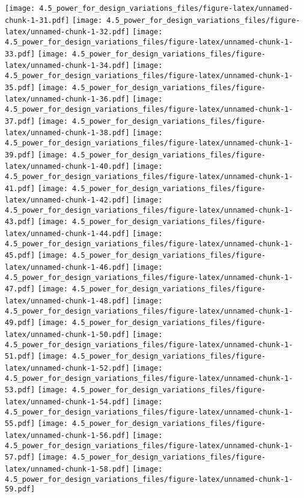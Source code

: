 \documentclass[]{article}
\begin{document}
\texttt{[image: 4.5\_power\_for\_design\_variations\_files/figure-latex/unnamed-chunk-1-31.pdf]}
\texttt{[image: 4.5\_power\_for\_design\_variations\_files/figure-latex/unnamed-chunk-1-32.pdf]}
\texttt{[image: 4.5\_power\_for\_design\_variations\_files/figure-latex/unnamed-chunk-1-33.pdf]}
\texttt{[image: 4.5\_power\_for\_design\_variations\_files/figure-latex/unnamed-chunk-1-34.pdf]}
\texttt{[image: 4.5\_power\_for\_design\_variations\_files/figure-latex/unnamed-chunk-1-35.pdf]}
\texttt{[image: 4.5\_power\_for\_design\_variations\_files/figure-latex/unnamed-chunk-1-36.pdf]}
\texttt{[image: 4.5\_power\_for\_design\_variations\_files/figure-latex/unnamed-chunk-1-37.pdf]}
\texttt{[image: 4.5\_power\_for\_design\_variations\_files/figure-latex/unnamed-chunk-1-38.pdf]}
\texttt{[image: 4.5\_power\_for\_design\_variations\_files/figure-latex/unnamed-chunk-1-39.pdf]}
\texttt{[image: 4.5\_power\_for\_design\_variations\_files/figure-latex/unnamed-chunk-1-40.pdf]}
\texttt{[image: 4.5\_power\_for\_design\_variations\_files/figure-latex/unnamed-chunk-1-41.pdf]}
\texttt{[image: 4.5\_power\_for\_design\_variations\_files/figure-latex/unnamed-chunk-1-42.pdf]}
\texttt{[image: 4.5\_power\_for\_design\_variations\_files/figure-latex/unnamed-chunk-1-43.pdf]}
\texttt{[image: 4.5\_power\_for\_design\_variations\_files/figure-latex/unnamed-chunk-1-44.pdf]}
\texttt{[image: 4.5\_power\_for\_design\_variations\_files/figure-latex/unnamed-chunk-1-45.pdf]}
\texttt{[image: 4.5\_power\_for\_design\_variations\_files/figure-latex/unnamed-chunk-1-46.pdf]}
\texttt{[image: 4.5\_power\_for\_design\_variations\_files/figure-latex/unnamed-chunk-1-47.pdf]}
\texttt{[image: 4.5\_power\_for\_design\_variations\_files/figure-latex/unnamed-chunk-1-48.pdf]}
\texttt{[image: 4.5\_power\_for\_design\_variations\_files/figure-latex/unnamed-chunk-1-49.pdf]}
\texttt{[image: 4.5\_power\_for\_design\_variations\_files/figure-latex/unnamed-chunk-1-50.pdf]}
\texttt{[image: 4.5\_power\_for\_design\_variations\_files/figure-latex/unnamed-chunk-1-51.pdf]}
\texttt{[image: 4.5\_power\_for\_design\_variations\_files/figure-latex/unnamed-chunk-1-52.pdf]}
\texttt{[image: 4.5\_power\_for\_design\_variations\_files/figure-latex/unnamed-chunk-1-53.pdf]}
\texttt{[image: 4.5\_power\_for\_design\_variations\_files/figure-latex/unnamed-chunk-1-54.pdf]}
\texttt{[image: 4.5\_power\_for\_design\_variations\_files/figure-latex/unnamed-chunk-1-55.pdf]}
\texttt{[image: 4.5\_power\_for\_design\_variations\_files/figure-latex/unnamed-chunk-1-56.pdf]}
\texttt{[image: 4.5\_power\_for\_design\_variations\_files/figure-latex/unnamed-chunk-1-57.pdf]}
\texttt{[image: 4.5\_power\_for\_design\_variations\_files/figure-latex/unnamed-chunk-1-58.pdf]}
\texttt{[image: 4.5\_power\_for\_design\_variations\_files/figure-latex/unnamed-chunk-1-59.pdf]}
\end{document}
